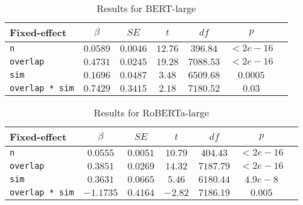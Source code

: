 \documentclass[11pt]{article}    %
\begin{document}

\begin{table}[!h]
\centering
\begin{tabular}{@{}lcccccc@{}}
\toprule
Fixed-effect           & $\beta$   & $SE$     & $t$     & $df$      & $p$      \\ \midrule
\texttt{n}             & $0.0589$  & $0.0046$ & $12.76$ & $396.84$  & $<2e-16$ \\
\texttt{overlap}       & $0.4731$  & $0.0245$ & $19.28$ & $7088.53$ & $<2e-16$ \\
\texttt{sim}           & $0.1696$  & $0.0487$ & $3.48$  & $6509.68$ & $0.0005$ \\
\texttt{overlap * sim} & $0.7429$ & $0.3415$ & $2.18$ & $7180.52$ & $0.03$  \\ \bottomrule
\end{tabular}
\caption{Results for BERT-large}
\label{tab:bert}
\end{table}


\begin{table}[!h]
\centering
\begin{tabular}{@{}lcccccc@{}}
\toprule
Fixed-effect           & $\beta$   & $SE$     & $t$     & $df$      & $p$      \\ \midrule
\texttt{n}             & $0.0555$  & $0.0051$ & $10.79$ & $404.43$  & $<2e-16$ \\
\texttt{overlap}       & $0.3851$  & $0.0269$ & $14.32$ & $7187.79$ & $<2e-16$ \\
\texttt{sim}           & $0.3631$  & $0.0665$ & $5.46$  & $6180.44$ & $4.9e-8$ \\
\texttt{overlap * sim} & $-1.1735$ & $0.4164$ & $-2.82$ & $7186.19$ & $0.005$  \\ \bottomrule
\end{tabular}
\caption{Results for RoBERTa-large}
\label{tab:roberta}
\end{table}


\clearpage



\end{document}
